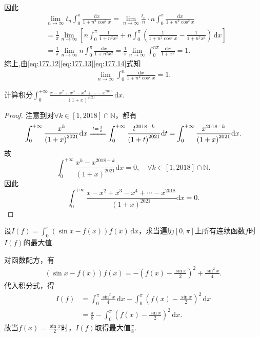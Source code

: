 \documentclass[../../main.tex]{subfiles}%
\begin{document}
\begin{solution}
\begin{align*}
\end{align*}
因此
\begin{align}
&\lim\limits_{n\rightarrow \infty}t_n\int_0^{\pi}{\frac{\mathrm{d}x}{1+n^2\cos ^2x}}=\lim\limits_{n\rightarrow \infty}\frac{t_n}{n}\cdot n\int_0^{\pi}{\frac{\mathrm{d}x}{1+n^2\cos ^2x}} \nonumber \\
&=\frac{1}{\pi}\lim\limits_{n\rightarrow \infty}\left[ n\int_0^{\pi}{\frac{1}{1+n^2x^2}}+n\int_0^{\pi}{\left( \frac{1}{1+n^2\cos ^2x}-\frac{1}{1+n^2x^2} \right)\,\mathrm{d}x} \right] \nonumber \\
&=\frac{1}{\pi}\lim\limits_{n\rightarrow \infty}n\int_0^{\pi}{\frac{\mathrm{d}x}{1+n^2x^2}}=\frac{1}{\pi}\lim\limits_{n\rightarrow \infty}\int_0^{n\pi}{\frac{\mathrm{d}x}{1+x^2}}=1. \label{eq:177.14}
\end{align}
综上,由\eqref{eq:177.12}\eqref{eq:177.13}\eqref{eq:177.14}式知
\begin{align*}
\lim_{n\rightarrow \infty} \int_0^n{\frac{\mathrm{d}x}{1+n^2\cos ^2x}}=1.
\end{align*}

\end{solution}

\begin{example}
计算积分$\int_{0}^{+\infty} \frac{x - x^2 + x^3 - x^4 + \cdots - x^{2018}}{(1 + x)^{2021}}\,\mathrm{d}x$.
\end{example}
\begin{proof}
注意到对$\forall k\in \left[ 1,2018 \right] \cap \mathbb{N}$，都有
$$\int_0^{+\infty}{\frac{x^k}{\left( 1+x \right) ^{2021}}\mathrm{d}x}\xlongequal{t=\frac{1}{x}}\int_0^{+\infty}{\frac{t^{2018-k}}{\left( 1+t \right) ^{2021}}\mathrm{d}t}=\int_0^{+\infty}{\frac{x^{2018-k}}{\left( 1+x \right) ^{2021}}\mathrm{d}x}.$$
故
$$\int_0^{+\infty}{\frac{x^k-x^{2018-k}}{\left( 1+x \right) ^{2021}}\mathrm{d}x}=0,\quad \forall k\in \left[ 1,2018 \right] \cap \mathbb{N} .$$
因此
$$\int_0^{+\infty}{\frac{x-x^2+x^3-x^4+\cdots -x^{2018}}{\left( 1+x \right) ^{2021}}\mathrm{d}x}=0.$$
\end{proof}

\begin{example}
设$I(f) = \int_{0}^{\pi} (\sin x - f(x))f(x)\,\mathrm{d}x$，求当遍历$[0, \pi]$上所有连续函数$f$时$I(f)$的最大值.
\end{example}
\begin{solution}
对函数配方，有
\begin{align*}
(\sin x - f(x))f(x) = -\left(f(x) - \frac{\sin x}{2}\right)^2 + \frac{\sin^2 x}{4}.
\end{align*}
代入积分式，得
\begin{align*}
I(f) &= \int_{0}^{\pi} \frac{\sin^2 x}{4}\,\mathrm{d}x - \int_{0}^{\pi} \left(f(x) - \frac{\sin x}{2}\right)^2\,\mathrm{d}x \\
&= \frac{\pi}{8} - \int_{0}^{\pi} \left(f(x) - \frac{\sin x}{2}\right)^2\,\mathrm{d}x.
\end{align*}
故当\(f(x) = \frac{\sin x}{2}\)时，\(I(f)\)取得最大值\(\frac{\pi}{8}\).

\end{solution}
\end{document}
